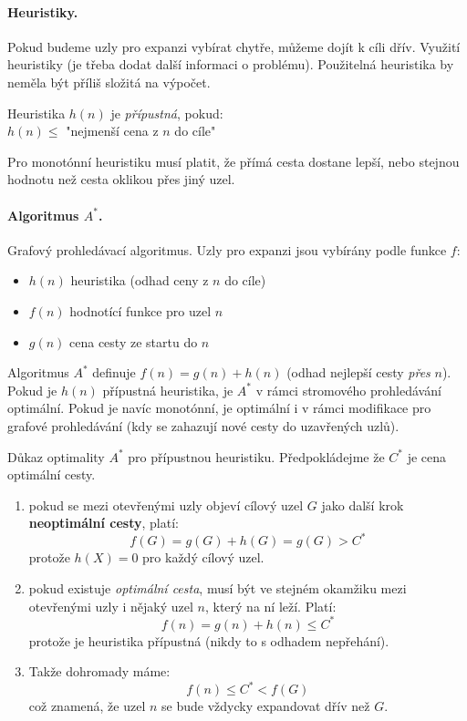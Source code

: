 \documentclass[a4paper]{article}      %
\newenvironment{proof}[1][Důkaz]{\begin{trivlist}
\item[\hskip \labelsep {\bfseries #1}]}{\end{trivlist}}
\newenvironment{definition}[1][Definice]{\begin{trivlist}
\item[\hskip \labelsep {\bfseries #1}]}{\end{trivlist}}
\begin{document}
\paragraph{Heuristiky.} Pokud budeme uzly pro expanzi vybírat chytře, můžeme dojít k cíli dřív. Využití heuristiky (je třeba dodat další informaci o problému). Použitelná heuristika by neměla být příliš složitá na výpočet.

\begin{definition}[Přípustná heuristika]
Heuristika $h(n)$ je \emph{přípustná}, pokud:\\
$h(n) \leq$ "nejmenší cena z $n$ do cíle"
\end{definition}

\begin{definition}[Monotónní heuristika]
Pro monotónní heuristiku musí platit, že přímá cesta dostane lepší, nebo stejnou hodnotu než cesta oklikou přes jiný uzel.
\end{definition}

\paragraph{Algoritmus $A^*$.}
Grafový prohledávací algoritmus. Uzly pro expanzi jsou vybírány podle funkce $f$:
\begin{itemize}
\item $h(n)$ heuristika (odhad ceny z $n$ do cíle)
\item $f(n)$ hodnotící funkce pro uzel $n$
\item $g(n)$ cena cesty ze startu do $n$
\end{itemize}
Algoritmus $A^*$ definuje $f(n) = g(n) + h(n)$ (odhad nejlepší cesty \emph{přes} $n$).
Pokud je $h(n)$ přípustná heuristika, je $A^*$ v rámci stromového prohledávání optimální. Pokud je navíc monotónní, je optimální i v rámci modifikace pro grafové prohledávání (kdy se zahazují nové cesty do uzavřených uzlů).\\

\begin{proof}
Důkaz optimality $A^{*}$ pro přípustnou heuristiku. Předpokládejme že $C^{*}$ je cena optimální cesty.
\begin{enumerate}
\item pokud se mezi otevřenými uzly objeví cílový uzel $G$ jako další krok \textbf{neoptimální cesty}, platí:
\[
f(G) = g(G) + h(G) = g(G) > C^{*}
\]
protože $h(X) = 0$ pro každý cílový uzel.
\item pokud existuje \emph{optimální cesta}, musí být ve stejném okamžiku mezi otevřenými uzly i nějaký uzel $n$, který na ní leží. Platí:
\[
f(n) = g(n) + h(n) \leq C^{*}
\]
protože je heuristika přípustná (nikdy to s odhadem nepřehání).
\item Takže dohromady máme:
\[
f(n) \leq C^{*} < f(G)
\]
což znamená, že uzel $n$ se bude vždycky expandovat dřív než $G$.
\end{enumerate}
\end{proof}
\end{document}
